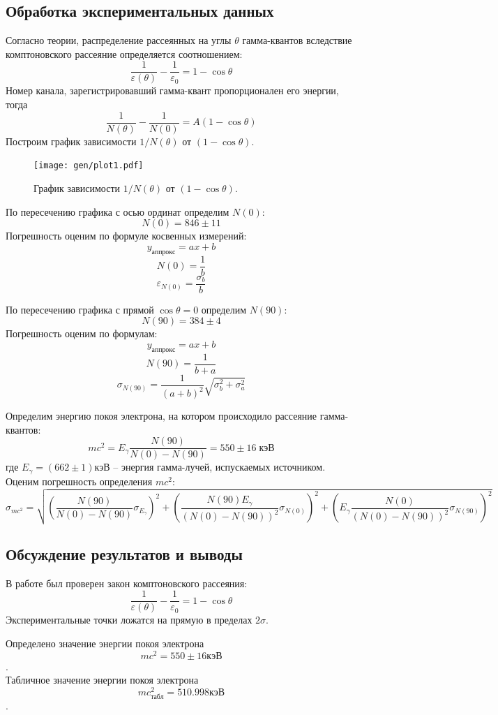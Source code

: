 \documentclass[10pt,a4paper]{article}
\begin{document}
	\subsection*{Обработка экспериментальных данных}
	
	Согласно теории, распределение рассеянных на углы $\theta$ гамма-квантов вследствие комптоновского рассеяние определяется соотношением: 
	$$
	\frac{1}{\varepsilon(\theta)} - \frac{1}{\varepsilon_0} = 1 - \cos \theta
	$$
	Номер канала, зарегистрировавший гамма-квант пропорционален его энергии, тогда
	$$
	\frac{1}{N(\theta)} - \frac{1}{N(0)} = A (1 - \cos \theta)
	$$
	Построим график зависимости $1/N(\theta)$ от $(1 - \cos \theta)$.\\
	\begin{figure}
		\centering
		\texttt{[image: gen/plot1.pdf]}
		\caption{График зависимости $1/N(\theta)$ от $(1 - \cos \theta)$.}
	\end{figure}

	По пересечению графика с осью ординат определим $N(0)$:
	$$N(0) = 846 \pm 11$$
	Погрешность оценим по формуле косвенных измерений: 
	$$y_{аппрокс} = ax + b$$
	$$N(0) = \frac{1}{b}$$
	$$\varepsilon_{N(0)} = \frac{\sigma_b}{b}$$
	
	По пересечению графика с прямой $\cos \theta = 0$ определим $N(90)$:
	$$N(90) = 384 \pm 4$$
	Погрешность оценим по формулам: 
	$$y_{аппрокс} = ax + b$$
	$$N(90) = \frac{1}{b + a}$$ 
	$$\sigma_{N(90)} = \frac{1}{(a + b)^2}\sqrt{\sigma_b^2 + \sigma_a^2}$$
	
	Определим энергию покоя электрона, на котором происходило рассеяние гамма-квантов: \\
	$$
	mc^2 = E_\gamma \frac{N(90)}{N(0) - N(90)} = 550 \pm 16 \; кэВ
	$$
	где $E_\gamma = (662\pm1) кэВ$ -- энергия гамма-лучей, испускаемых источником. Оценим погрешность определения $mc^2$:\\
	$$\sigma_{mc^2} = \sqrt{(\frac{N(90)}{N(0) - N(90)} \sigma_{E_\gamma})^2 + (\frac{N(90) E_\gamma}{(N(0) - N(90))^2} \sigma_{N(0)})^2 + (E_\gamma \frac{N(0)}{(N(0) - N(90))^2}\sigma_{N(90)})^2}$$
	
	\subsection*{Обсуждение результатов и выводы}
	
	В работе был проверен закон комптоновского рассеяния:
	$$
	\frac{1}{\varepsilon(\theta)} - \frac{1}{\varepsilon_0} = 1 - \cos \theta
	$$
	Экспериментальные точки ложатся на прямую в пределах $2\sigma$.
	
	Определено значение энергии покоя электрона $$mc^2 = 550 \pm 16 кэВ$$. \\
	Табличное значение энергии покоя электрона $$mc^2_{табл} = 510.998 кэВ$$.
	
\end{document}
